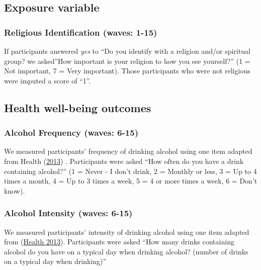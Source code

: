 \documentclass[
  singlecolumn]{report}
\begin{document}
\hypertarget{exposure-variable}{%
\subsection{Exposure variable}\label{exposure-variable}}

\hypertarget{religious-identification-waves-1-15}{%
\subsubsection{Religious Identification (waves:
1-15)}\label{religious-identification-waves-1-15}}

If participants answered \emph{yes} to ``Do you identify with a religion
and/or spiritual group? we asked''How important is your religion to how
you see yourself?'' (1 = Not important, 7 = Very important). Those
participants who were not religious were imputed a score of ``1''.

\hypertarget{health-well-being-outcomes}{%
\subsection{Health well-being
outcomes}\label{health-well-being-outcomes}}

\hypertarget{alcohol-frequency-waves-6-15}{%
\subsubsection{Alcohol Frequency (waves:
6-15)}\label{alcohol-frequency-waves-6-15}}

We measured participants' frequency of drinking alcohol using one item
adapted from Health
(\protect\hyperlink{ref-Ministry_of_Health_2013}{2013}) . Participants
were asked ``How often do you have a drink containing alcohol?'' (1 =
Never - I don't drink, 2 = Monthly or less, 3 = Up to 4 times a month, 4
= Up to 3 times a week, 5 = 4 or more times a week, 6 = Don't know).

\hypertarget{alcohol-intensity-waves-6-15}{%
\subsubsection{Alcohol Intensity (waves:
6-15)}\label{alcohol-intensity-waves-6-15}}

We measured participants' intensity of drinking alcohol using one item
adapted from (\protect\hyperlink{ref-Ministry_of_Health_2013}{Health
2013}). Participants were asked ``How many drinks containing alcohol do
you have on a typical day when drinking alcohol? (number of drinks on a
typical day when drinking)''
\end{document}
